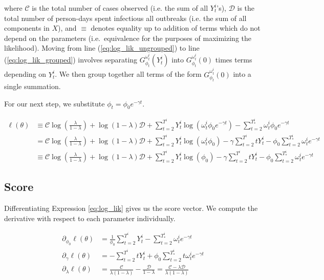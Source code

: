 \documentclass[11pt, oneside]{article}   	%
\begin{document}
\begin{appendices}
	where $\mathcal{C}$ is the total number of cases observed (i.e. the sum of all $Y_t^i$'s), $\mathscr{D}$ is the total number of person-days spent infectious all outbreaks (i.e. the sum of all components in $X$), and $\equiv$ denotes equality up to addition of terms which do not depend on the parameters (i.e.\ equivalence for the purposes of maximizing the likelihood). Moving from line (\ref{eq:log_lik_ungrouped}) to line (\ref{eq:log_lik_grouped}) involves separating $G_{\phi_t}^{\omega^i_t}(Y^i_t)$ into $G_{\phi_t}^{\omega^i_t}(0)$ times terms depending on $Y^i_t$. We then group together all terms of the form $G_{\phi_t}^{\omega^i_t}(0)$ into a single summation.

	For our next step, we substitute $\phi_t = \phi_0 e^{-\gamma t}$.

	\begin{align}
		\ell (\theta) &\equiv \mathcal{C} \log\left(\frac{\lambda}{1-\lambda}\right) + \log(1-\lambda) \mathscr{D} + \sum_{t=2}^{T^i} Y^i_t \log(\omega^i_t \phi_0 e^{-\gamma t}) - \sum_{t=2}^{T_*^i} \omega^i_t \phi_0 e^{- \gamma t}\\
		&= \mathcal{C} \log\left(\frac{\lambda}{1-\lambda}\right) + \log(1-\lambda) \mathscr{D} + \sum_{t=2}^{T^i} Y^i_t \log(\omega^i_t \phi_0) - \gamma \sum_{t=2}^{T^i} t Y^i_t - \phi_0 \sum_{t=2}^{T^i_*} \omega^i_t e^{-\gamma t}\\
		& \equiv \mathcal{C} \log\left(\frac{\lambda}{1-\lambda}\right) + \log(1-\lambda) \mathscr{D} + \sum_{t=2}^{T^i} Y^i_t \log(\phi_0) - \gamma \sum_{t=2}^{T^i} t Y^i_t - \phi_0 \sum_{t=2}^{T^i_*} \omega^i_t e^{-\gamma t} \label{eq:log_lik}
	\end{align}

	\subsection{Score}

	Differentiating Expression \ref{eq:log_lik} gives us the score vector. We compute the derivative with respect to each parameter individually.

	\begin{align}
		\partial_{\phi_0} \ell(\theta) &= \frac{1}{\phi_0}\sum_{t=2}^{T^i} Y^i_t - \sum_{t=2}^{T_*^i} \omega^i_t e^{-\gamma t}\\
		\partial_{\gamma} \ell(\theta) &= - \sum_{t=2}^{T^i} t Y^i_t + \phi_0 \sum_{t=2}^{T_*^i} t \omega^i_t e^{-\gamma t}\\
		\partial_{\lambda} \ell(\theta) &= \frac{\mathcal{C}}{\lambda (1 - \lambda)} - \frac{\mathscr{D}}{1 - \lambda} = \frac{\mathcal{C} - \lambda \mathscr{D}}{\lambda (1-\lambda)}
	\end{align}


\end{appendices}
\end{document}
